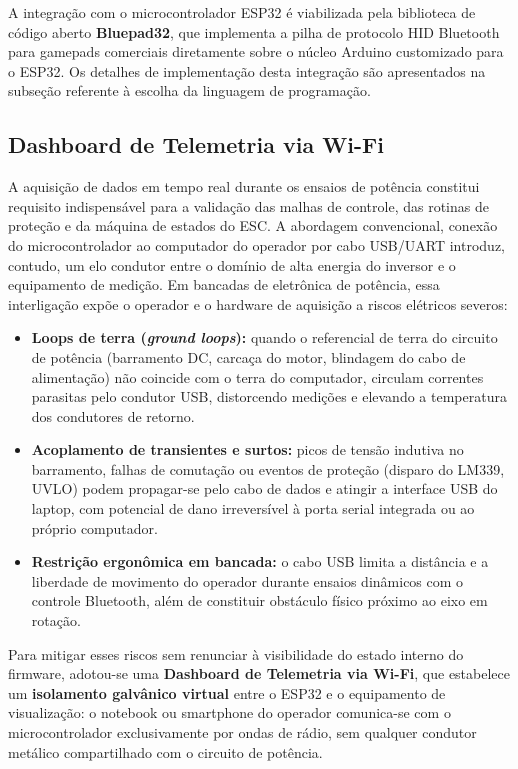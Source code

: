A integração com o microcontrolador ESP32 é viabilizada pela biblioteca de código aberto \textbf{Bluepad32}, que implementa a pilha de protocolo HID Bluetooth para gamepads comerciais diretamente sobre o núcleo Arduino customizado para o ESP32. Os detalhes de implementação desta integração são apresentados na subseção referente à escolha da linguagem de programação.

\subsection{Dashboard de Telemetria via Wi-Fi}

A aquisição de dados em tempo real durante os ensaios de potência constitui requisito indispensável para a validação das malhas de controle, das rotinas de proteção e da máquina de estados do ESC. A abordagem convencional, conexão do microcontrolador ao computador do operador por cabo USB/UART introduz, contudo, um elo condutor entre o domínio de alta energia do inversor e o equipamento de medição. Em bancadas de eletrônica de potência, essa interligação expõe o operador e o hardware de aquisição a riscos elétricos severos:

\begin{itemize}
    \item \textbf{Loops de terra (\textit{ground loops}):} quando o referencial de terra do circuito de potência (barramento DC, carcaça do motor, blindagem do cabo de alimentação) não coincide com o terra do computador, circulam correntes parasitas pelo condutor USB, distorcendo medições e elevando a temperatura dos condutores de retorno.
    \item \textbf{Acoplamento de transientes e surtos:} picos de tensão indutiva no barramento, falhas de comutação ou eventos de proteção (disparo do LM339, UVLO) podem propagar-se pelo cabo de dados e atingir a interface USB do laptop, com potencial de dano irreversível à porta serial integrada ou ao próprio computador.
    \item \textbf{Restrição ergonômica em bancada:} o cabo USB limita a distância e a liberdade de movimento do operador durante ensaios dinâmicos com o controle Bluetooth, além de constituir obstáculo físico próximo ao eixo em rotação.
\end{itemize}

Para mitigar esses riscos sem renunciar à visibilidade do estado interno do firmware, adotou-se uma \textbf{Dashboard de Telemetria via Wi-Fi}, que estabelece um \textbf{isolamento galvânico virtual} entre o ESP32 e o equipamento de visualização: o notebook ou smartphone do operador comunica-se com o microcontrolador exclusivamente por ondas de rádio, sem qualquer condutor metálico compartilhado com o circuito de potência.

